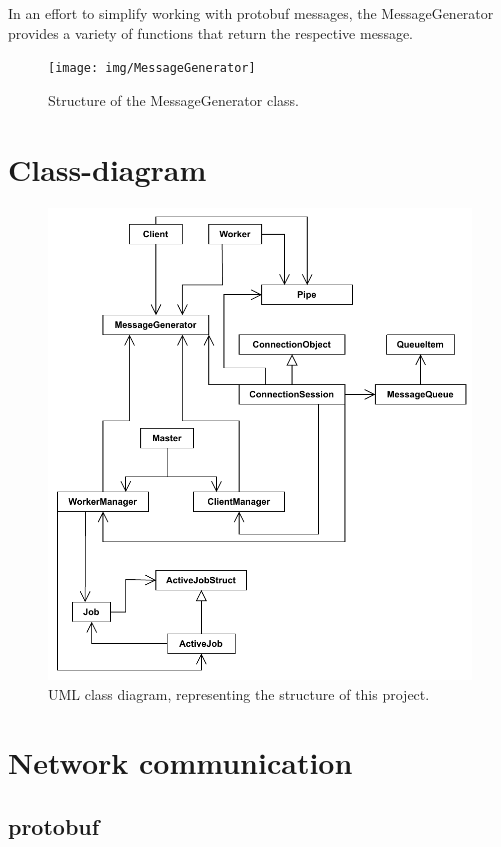 \documentclass[12pt, letterpaper]{article}
\begin{document}
In an effort to simplify working with protobuf messages, the MessageGenerator provides a variety of functions that return the respective message. 

\begin{figure}[h]
	\centering
	\texttt{[image: img/MessageGenerator]}
	\caption{Structure of the MessageGenerator class.}
	\label{fig:classes_MessageGenerator}
\end{figure}

\pagebreak
\section{Class-diagram}

\begin{figure}[hp]
	\centering
	\includegraphics[width=0.9\linewidth]{img/ClassDiagram}
	\caption{UML class diagram, representing the structure of this project.}
	\label{fig:classDiagram}
\end{figure}

\section{Network communication}

\subsection{protobuf}
\end{document}
